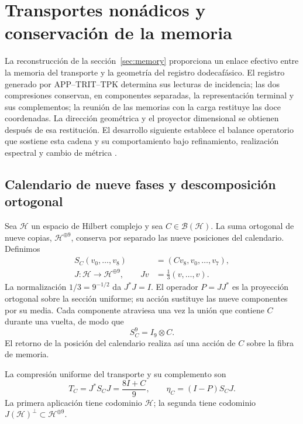 \section{Transportes nonádicos y conservación de la memoria}
\label{sec:nonadic}

La reconstrucción de la sección~\ref{sec:memory} proporciona un enlace
efectivo entre la memoria del transporte y la geometría del registro
dodecafásico. El registro generado por APP--TRIT--TPK determina sus
lecturas de incidencia; las dos compresiones conservan, en componentes
separadas, la representación terminal y sus complementos; la reunión de
las memorias con la carga restituye las doce coordenadas. La dirección
geométrica y el proyector dimensional se obtienen después de esa
restitución. El desarrollo siguiente establece el balance operatorio
que sostiene esta cadena y su comportamiento bajo refinamiento,
realización espectral y cambio de métrica
\cite{HMT-VIII,hmtX}.

\subsection{Calendario de nueve fases y descomposición ortogonal}

Sea \(\mathcal H\) un espacio de Hilbert complejo y sea
\(C\in\mathcal B(\mathcal H)\). La suma ortogonal de nueve copias,
\(\mathcal H^{\oplus9}\), conserva por separado las nueve posiciones
del calendario. Definimos
\begin{equation}
 \begin{split}
 S_C(v_0,\ldots,v_8)&=(Cv_8,v_0,\ldots,v_7),\\
 J:\mathcal H\longrightarrow\mathcal H^{\oplus9},
 \qquad Jv&=\frac13(v,\ldots,v).
 \end{split}
 \label{nt:calendar}
\end{equation}
La normalización \(1/3=9^{-1/2}\) da \(J^*J=I\). El operador
\(P=JJ^*\) es la proyección ortogonal sobre la sección uniforme;
su acción sustituye las nueve componentes por su media. Cada
componente atraviesa una vez la unión que contiene \(C\) durante una
vuelta, de modo que
\begin{equation}
 S_C^9=I_9\otimes C.
 \label{nt:full-return}
\end{equation}
El retorno de la posición del calendario realiza así una acción de
\(C\) sobre la fibra de memoria.

\begin{definition}
La compresión uniforme del transporte y su complemento son
\begin{equation}
 T_C=J^*S_CJ=\frac{8I+C}{9},
 \qquad
 \eta_C=(I-P)S_CJ.
 \label{nt:compression}
\end{equation}
La primera aplicación tiene codominio \(\mathcal H\); la segunda
tiene codominio \(J(\mathcal H)^\perp\subset\mathcal H^{\oplus9}\).
\end{definition}

